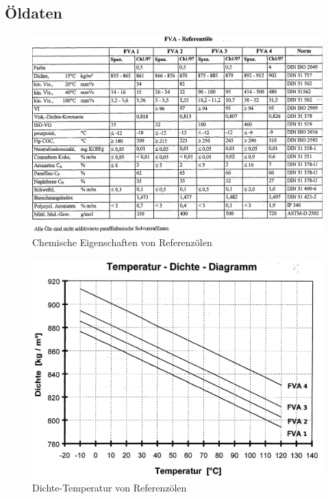 \begin{appendices}
    \chapter{Öldaten}
        \begin{figure}
            \centering
            \includegraphics[width=0.9\linewidth]{./images/fva_chemische_daten.png}
            \caption{Chemische Eigenschaften von Referenzölen \cite{schilling_1985}}
            \label{fig:fva_chemische_eigenschaften_referenzoelen}
        \end{figure}

        \begin{figure}
            \centering
            \includegraphics[width=0.9\linewidth]{./images/fva_dichte_temperatur.png}
            \caption{Dichte-Temperatur von Referenzölen \cite{schilling_1985}}
            \label{fig:fva_dichte_temperatur}
        \end{figure}


\end{appendices}
